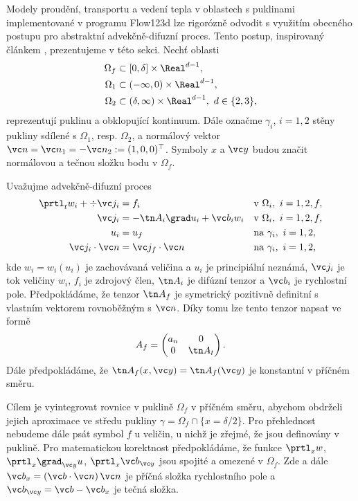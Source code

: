 


Modely proudění, transportu a vedení tepla v oblastech s puklinami implementované v programu Flow123d lze rigorózně odvodit s využitím obecného postupu pro abstraktní advekčně-difuzní proces.
Tento postup, inspirovaný článkem \cite{martin_modeling_2005}, prezentujeme v této sekci.
Nechť oblasti
\begin{align*}
 \Omega_f &\subset [0,\delta] \times \Real^{d-1},\\
 \Omega_1 &\subset (-\infty,0)\times \Real^{d-1},\\
 \Omega_2 &\subset (\delta,\infty)\times \Real^{d-1},~d\in\{2,3\},
\end{align*}
reprezentují puklinu a obklopující kontinuum.
Dále označme $\gamma_i$, $i=1,2$ stěny pukliny sdílené s $\Omega_1$, resp. $\Omega_2$,
a normálový vektor $\vc n=\vc n_1=-\vc n_2:=(1,0,0)^\top$.
Symboly $x$ a $\vc y$ budou značit normálovou a tečnou složku bodu v $\Omega_f$. 

Uvažujme advekčně-difuzní proces
\begin{align}
  \label{eq:fr:continuity}
  \prtl_t w_i + \div \vc j_i &= f_i&&  \text{v } \Omega_i,\ i=1,2,f,\\
  \label{eq:fr:flux}
  \vc j_i &= - \tn A_i\grad u_i + \vc b_i w_i&& \text{v } \Omega_i,\ i=1,2,f,\\
  \label{eq:fr:Dirichlet}
  u_i &= u_f&& \text{na } \gamma_i,\ i=1,2,\\
  \label{eq:fr:Neumann}
  \vc j_i \cdot \vc n &= \vc j_f \cdot \vc n&& \text{na } \gamma_i,\ i=1,2,
\end{align}
kde $w_i=w_i(u_i)$ je zachovávaná veličina a $u_i$ je principiální neznámá, $\vc j_i$ je tok veličiny $w_i$, $f_i$ je zdrojový člen,
$\tn A_i$ je difúzní tenzor a $\vc b_i$ je rychlostní pole.
Předpokládáme, že tenzor $\tn A_f$ je symetrický pozitivně definitní 
s vlastním vektorem rovnoběžným s $\vc n$.
Díky tomu lze tento tenzor napsat ve formě
\[
 A_f = \begin{pmatrix} 
            a_n & 0  \\
            0 & \tn A_t
       \end{pmatrix}.
\]
Dále předpokládáme, že $\tn A_f(x, \vc y)=\tn A_f(\vc y)$ je konstantní v příčném směru.

Cílem je vyintegrovat rovnice v puklině $\Omega_f$ v příčném směru, abychom obdrželi jejich aproximace ve středu pukliny $\gamma=\Omega_f \cap \{x=\delta/2\}$. 
Pro přehlednost nebudeme dále psát symbol $f$ u veličin, u nichž je zřejmé, že jsou definovány v puklině. 
Pro matematickou korektnost předpokládáme, že funkce
$\prtl_x w$, $\prtl_x \grad_{\vc y} u$, $\prtl_x \vc b_{\vc y}$ jsou spojité a omezené v $\Omega_f$. Zde a dále
$\vc b_x=(\vc b \cdot \vc n)\, \vc n$ je příčná složka rychlostního pole a $\vc b_{\vc y} = \vc b - \vc b_x$ je tečná složka.

